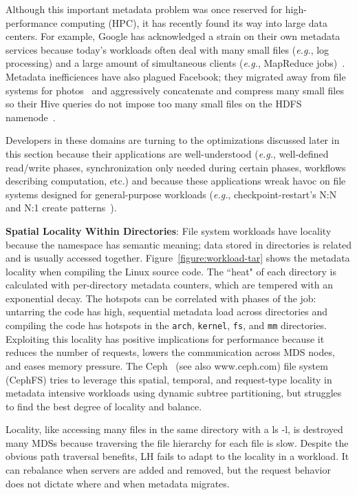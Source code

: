 Although this important metadata problem was once reserved for high-performance
computing (HPC), it has recently found its way into large data centers. For
example, Google has acknowledged a strain on their own metadata services
because today's workloads often deal with many small files ({\it e.g.}, log
processing) and a large amount of simultaneous clients ({\it e.g.}, MapReduce
jobs)~\cite{mckusick:acm2010-gfs-evolution}. Metadata inefficiences have also
plagued Facebook; they migrated away from file systems for
photos~\cite{beaver:osdi2010-haystack} and aggressively concatenate and
compress many small files so their Hive queries do not impose too many small
files on the HDFS namenode~\cite{thusoo:sigmod2010-facebook-infrastructure}. 

Developers in these domains are turning to the optimizations discussed later in
this section because their applications are well-understood ({\it e.g.},
well-defined read/write phases, synchronization only needed during certain
phases, workflows describing computation, etc.) and because these applications
wreak havoc on file systems designed for general-purpose workloads ({\it e.g.},
checkpoint-restart's N:N and N:1 create patterns~\cite{bent_plfs_2009}).

\textbf{Spatial Locality Within Directories}: File system workloads have
locality because the namespace has semantic meaning; data stored in directories
is related and is usually accessed together.  Figure~\ref{figure:workload-tar}
shows the metadata locality when compiling the Linux source code. The ``heat"
of each directory is calculated with per-directory metadata counters, which are
tempered with an exponential decay.  The hotspots can be correlated with phases
of the job: untarring the code has high, sequential metadata load across
directories and compiling the code has hotspots in the \texttt{arch},
\texttt{kernel}, \texttt{fs}, and \texttt{mm} directories. Exploiting this
locality has positive implications for performance because it reduces the
number of requests, lowers the communication across MDS nodes, and eases memory
pressure. The Ceph~\cite{weil:osdi2006-ceph} (see also www.ceph.com) file
system (CephFS) tries to leverage this spatial, temporal, and request-type
locality in metadata intensive workloads using dynamic subtree partitioning,
but struggles to find the best degree of locality and balance.

Locality, like accessing many files in the same directory with a ls -l, is
destroyed many MDSs because traversing the file hierarchy for each file is
slow. Despite the obvious path traversal benefits, LH fails to adapt to the
locality in a workload. It can rebalance when servers are added and removed,
but the request behavior does not dictate where and when metadata migrates.

